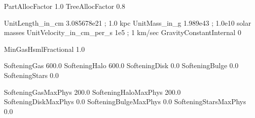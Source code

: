 
PartAllocFactor       1.0
TreeAllocFactor       0.8




UnitLength_in_cm         3.085678e21        ;  1.0 kpc
UnitMass_in_g            1.989e43           ;  1.0e10 solar masses
UnitVelocity_in_cm_per_s 1e5                ;  1 km/sec
GravityConstantInternal  0



MinGasHsmlFractional     1.0  %

SofteningGas       600.0
SofteningHalo      600.0
SofteningDisk      0.0
SofteningBulge     0.0           
SofteningStars     0.0

SofteningGasMaxPhys       200.0
SofteningHaloMaxPhys      200.0
SofteningDiskMaxPhys      0.0
SofteningBulgeMaxPhys     0.0           
SofteningStarsMaxPhys     0.0













